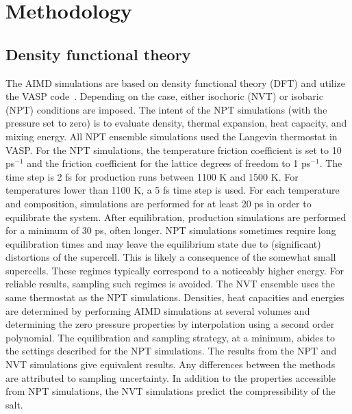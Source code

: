 \documentclass[preprint,3p,10pt,twocolumn,number,sort&compress]{elsarticle}
\begin{document}
\section{Methodology}
\label{sec:method}
\subsection{Density functional theory}
The AIMD simulations are based on density functional theory (DFT) and utilize the VASP code~\cite{Kresse1996}.
Depending on the case, either isochoric (NVT) or isobaric (NPT) conditions are imposed. The intent of the NPT simulations (with the pressure set to zero) is to evaluate density, thermal expansion, heat capacity, and mixing energy. All NPT ensemble simulations used the Langevin thermostat in VASP. For the NPT simulations, the temperature friction coefficient is set to 10 ps$^{-1}$ and the friction coefficient for the lattice degrees of freedom to 1 ps$^{-1}$. The time step is 2 fs for production runs between 1100 K and 1500 K. For temperatures lower than 1100 K, a 5 fs time step is used. 
For each temperature and composition, simulations are performed for at least 20 ps in order to equilibrate the system. 
After equilibration, production simulations are performed for a minimum of 30 ps, often longer. NPT simulations sometimes require long equilibration times and may leave the equilibrium state due to (significant) distortions of the supercell. This is likely a consequence of the somewhat small supercells. These regimes typically correspond to a noticeably higher energy. 
For reliable results, sampling such regimes is avoided. 
The NVT ensemble uses the same thermostat as the NPT simulations. Densities, heat capacities and energies are determined by performing AIMD simulations at several volumes and determining the zero pressure properties by interpolation using a second order polynomial. The equilibration and sampling strategy, at a minimum, abides to the settings described for the NPT simulations. The results from the NPT and NVT simulations give equivalent results. Any differences between the methods are attributed to sampling uncertainty. In addition to the properties accessible from NPT simulations, the NVT simulations predict the compressibility of the salt. 
\end{document}
